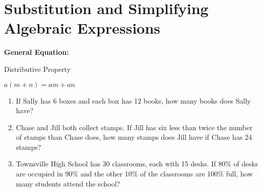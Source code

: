\section[Algebraic Expressions]{Substitution and Simplifying Algebraic Expressions}

\textbf{General Equation:}

\begin{center}
Distributive Property

$a(m+n)=am+an$
\end{center}

\vfill
\begin{enumerate}[labelindent=*,style=multiline,leftmargin=*,label=\textbf{Example \arabic*:}]
\item If Sally has 6 boxes and each box has 12 books, how many books does Sally have?

\vfill\item Chase and Jill both collect stamps. If Jill has six less than twice the number of stamps than Chase does, how many stamps does Jill have if Chase has 24 stamps?

\vfill\item Townsville High School has 30 classrooms, each with 15 desks. If 80\% of desks are occupied in 90\% and the other 10\% of the classrooms are 100\% full, how many students attend the school?
\end{enumerate}

